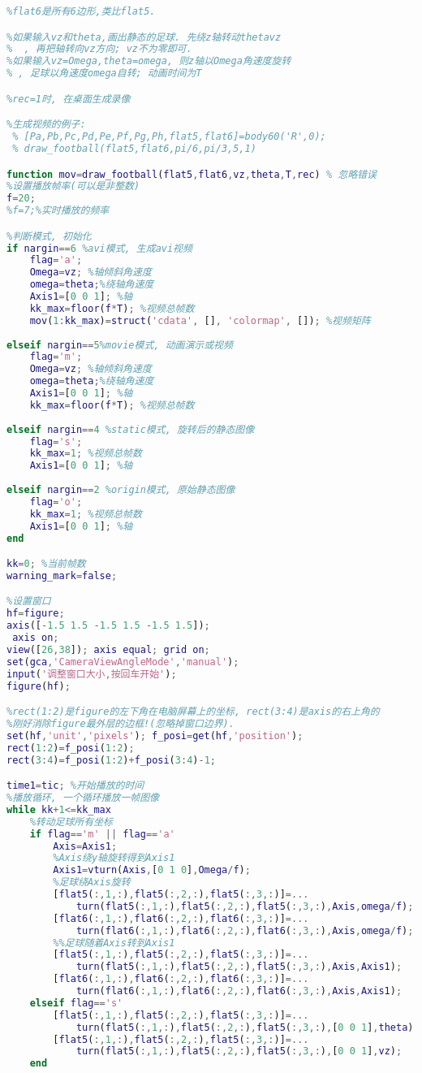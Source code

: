 \begin{lstlisting}[language=matlab]
%画出足球,flat5是所有的5边形,第n个5边形的第ii个点的坐标就是flat5(ii,:,n)
%flat6是所有6边形,类比flat5.

%如果输入vz和theta,画出静态的足球. 先绕z轴转动thetavz
%  , 再把轴转向vz方向; vz不为零即可.
%如果输入vz=Omega,theta=omega, 则z轴以Omega角速度旋转
% , 足球以角速度omega自转; 动画时间为T

%rec=1时, 在桌面生成录像

%生成视频的例子:
 % [Pa,Pb,Pc,Pd,Pe,Pf,Pg,Ph,flat5,flat6]=body60('R',0);
 % draw_football(flat5,flat6,pi/6,pi/3,5,1)

function mov=draw_football(flat5,flat6,vz,theta,T,rec) % 忽略错误
%设置播放帧率(可以是非整数)
f=20;
%f=7;%实时播放的频率

%判断模式, 初始化
if nargin==6 %avi模式, 生成avi视频
    flag='a'; 
    Omega=vz; %轴倾斜角速度
    omega=theta;%绕轴角速度
    Axis1=[0 0 1]; %轴
    kk_max=floor(f*T); %视频总帧数
    mov(1:kk_max)=struct('cdata', [], 'colormap', []); %视频矩阵
    
elseif nargin==5%movie模式, 动画演示或视频
    flag='m'; 
    Omega=vz; %轴倾斜角速度
    omega=theta;%绕轴角速度
    Axis1=[0 0 1]; %轴
    kk_max=floor(f*T); %视频总帧数
    
elseif nargin==4 %static模式, 旋转后的静态图像
    flag='s'; 
    kk_max=1; %视频总帧数
    Axis1=[0 0 1]; %轴
    
elseif nargin==2 %origin模式, 原始静态图像
    flag='o'; 
    kk_max=1; %视频总帧数
    Axis1=[0 0 1]; %轴
end

kk=0; %当前帧数
warning_mark=false;

%设置窗口
hf=figure;  
axis([-1.5 1.5 -1.5 1.5 -1.5 1.5]); 
 axis on;
view([26,38]); axis equal; grid on;
set(gca,'CameraViewAngleMode','manual');
input('调整窗口大小,按回车开始');
figure(hf);

%rect(1:2)是figure的左下角在电脑屏幕上的坐标, rect(3:4)是axis的右上角的
%刚好消除figure最外层的边框!(忽略掉窗口边界).
set(hf,'unit','pixels'); f_posi=get(hf,'position');
rect(1:2)=f_posi(1:2);
rect(3:4)=f_posi(1:2)+f_posi(3:4)-1;

time1=tic; %开始播放的时间
%播放循环, 一个循环播放一帧图像
while kk+1<=kk_max
    %转动足球所有坐标
    if flag=='m' || flag=='a'
        Axis=Axis1;
        %Axis绕y轴旋转得到Axis1
        Axis1=vturn(Axis,[0 1 0],Omega/f);
        %足球绕Axis旋转
        [flat5(:,1,:),flat5(:,2,:),flat5(:,3,:)]=...
            turn(flat5(:,1,:),flat5(:,2,:),flat5(:,3,:),Axis,omega/f);
        [flat6(:,1,:),flat6(:,2,:),flat6(:,3,:)]=...
            turn(flat6(:,1,:),flat6(:,2,:),flat6(:,3,:),Axis,omega/f);
        %%足球随着Axis转到Axis1
        [flat5(:,1,:),flat5(:,2,:),flat5(:,3,:)]=...
            turn(flat5(:,1,:),flat5(:,2,:),flat5(:,3,:),Axis,Axis1);
        [flat6(:,1,:),flat6(:,2,:),flat6(:,3,:)]=...
            turn(flat6(:,1,:),flat6(:,2,:),flat6(:,3,:),Axis,Axis1);
    elseif flag=='s'
        [flat5(:,1,:),flat5(:,2,:),flat5(:,3,:)]=...
            turn(flat5(:,1,:),flat5(:,2,:),flat5(:,3,:),[0 0 1],theta);
        [flat5(:,1,:),flat5(:,2,:),flat5(:,3,:)]=...
            turn(flat5(:,1,:),flat5(:,2,:),flat5(:,3,:),[0 0 1],vz);
    end
    

\end{lstlisting}
